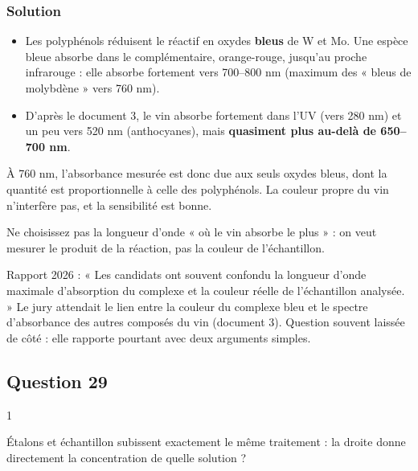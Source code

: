 \documentclass[11pt,a4paper]{article}
\providecommand{\tightlist}{\setlength{\itemsep}{0pt}\setlength{\parskip}{0pt}}
\begin{document}
\hypertarget{solution-27}{%
\subsubsection{Solution}\label{solution-27}}

\begin{itemize}
\tightlist
\item
  Les polyphénols réduisent le réactif en oxydes \textbf{bleus} de W et Mo. Une espèce bleue absorbe dans le complémentaire, orange-rouge, jusqu'au proche infrarouge : elle absorbe fortement vers 700--800 nm (maximum des « bleus de molybdène » vers 760 nm).
\item
  D'après le document 3, le vin absorbe fortement dans l'UV (vers 280 nm) et un peu vers 520 nm (anthocyanes), mais \textbf{quasiment plus au-delà de 650--700 nm}.
\end{itemize}

À 760 nm, l'absorbance mesurée est donc due aux seuls oxydes bleus, dont la quantité est proportionnelle à celle des polyphénols. La couleur propre du vin n'interfère pas, et la sensibilité est bonne.

\begin{piege}

Ne choisissez pas la longueur d'onde « où le vin absorbe le plus » : on veut mesurer le produit de la réaction, pas la couleur de l'échantillon.

\end{piege}

\begin{jury}

Rapport 2026 : « Les candidats ont souvent confondu la longueur d'onde maximale d'absorption du complexe et la couleur réelle de l'échantillon analysée. » Le jury attendait le lien entre la couleur du complexe bleu et le spectre d'absorbance des autres composés du vin (document 3). Question souvent laissée de côté : elle rapporte pourtant avec deux arguments simples.

\end{jury}

\hypertarget{question-29}{%
\subsection{Question 29}\label{question-29}}

\begin{indication}{1}

Étalons et échantillon subissent exactement le même traitement : la droite donne directement la concentration de quelle solution ?

\end{indication}
\end{document}
